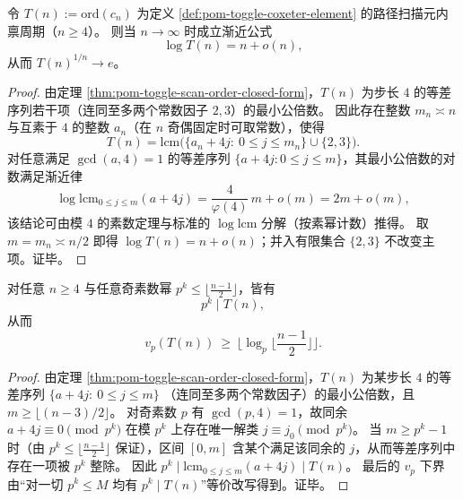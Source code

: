\begin{theorem}[扫描内禀周期的精确指数阶]\label{thm:pom-toggle-scan-order-log-asymptotic}
令 \(T(n):=\mathrm{ord}(c_n)\) 为定义 \ref{def:pom-toggle-coxeter-element} 的路径扫描元内禀周期（\(n\ge 4\)）。
则当 \(n\to\infty\) 时成立渐近公式
\[
\log T(n)=n+o(n),
\]
从而 \(T(n)^{1/n}\to e\)。
\end{theorem}
\begin{proof}
由定理 \ref{thm:pom-toggle-scan-order-closed-form}，\(T(n)\) 为步长 \(4\) 的等差序列若干项（连同至多两个常数因子 \(2,3\)）的最小公倍数。
因此存在整数 \(m_n\asymp n\) 与互素于 \(4\) 的整数 \(a_n\)（在 \(n\) 奇偶固定时可取常数），使得
\[
T(n)=\mathrm{lcm}\bigl(\{a_n+4j:\ 0\le j\le m_n\}\cup\{2,3\}\bigr).
\]
对任意满足 \(\gcd(a,4)=1\) 的等差序列 \(\{a+4j:0\le j\le m\}\)，其最小公倍数的对数满足渐近律
\[
\log \mathrm{lcm}_{0\le j\le m}(a+4j)=\frac{4}{\varphi(4)}\,m+o(m)=2m+o(m),
\]
该结论可由模 \(4\) 的素数定理与标准的 \(\log\mathrm{lcm}\) 分解（按素幂计数）推得。
取 \(m=m_n\asymp n/2\) 即得 \(\log T(n)=n+o(n)\)；并入有限集合 \(\{2,3\}\) 不改变主项。证毕。
\end{proof}

\begin{proposition}\label{prop:pom-toggle-scan-order-padic-lower-bound}
对任意 \(n\ge 4\) 与任意奇素数幂 \(p^k\le \big\lfloor\frac{n-1}{2}\big\rfloor\)，皆有
\[
p^k\mid T(n),
\]
从而
\[
v_p(T(n))\ \ge\ \Big\lfloor \log_p\Big\lfloor\frac{n-1}{2}\Big\rfloor\Big\rfloor.
\]
\end{proposition}
\begin{proof}
由定理 \ref{thm:pom-toggle-scan-order-closed-form}，\(T(n)\) 为某步长 \(4\) 的等差序列
\(
\{a+4j:\ 0\le j\le m\}
\)
（连同至多两个常数因子）的最小公倍数，且 \(m\ge \lfloor (n-3)/2\rfloor\)。
对奇素数 \(p\) 有 \(\gcd(p,4)=1\)，故同余
\(
a+4j\equiv 0\pmod{p^k}
\)
在模 \(p^k\) 上存在唯一解类 \(j\equiv j_0\pmod{p^k}\)。
当 \(m\ge p^k-1\) 时（由 \(p^k\le\lfloor\frac{n-1}{2}\rfloor\) 保证），区间 \([0,m]\) 含某个满足该同余的 \(j\)，从而等差序列中存在一项被 \(p^k\) 整除。
因此 \(p^k\mid \mathrm{lcm}_{0\le j\le m}(a+4j)\mid T(n)\)。
最后的 \(v_p\) 下界由“对一切 \(p^k\le M\) 均有 \(p^k\mid T(n)\)”等价改写得到。证毕。
\end{proof}

